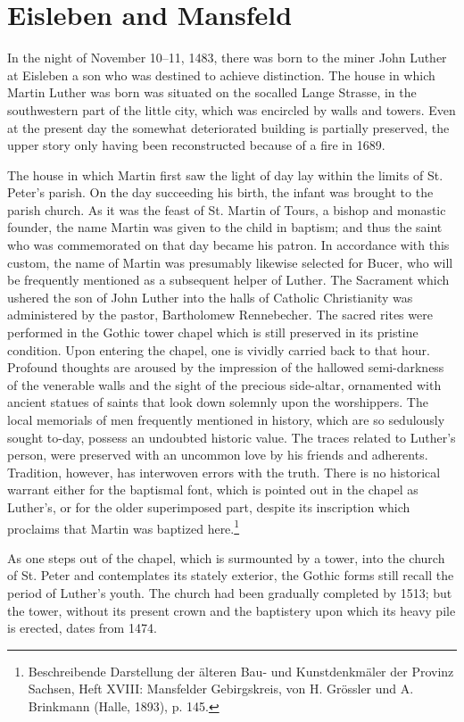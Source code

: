 \section{Eisleben and Mansfeld}

In the night of November 10--11, 1483, there was born to the miner
John Luther at Eisleben a son who was destined to achieve distinction.
The house in which Martin Luther was born was situated on the socalled Lange Strasse, in the southwestern part of the little city, which
was encircled by walls and towers. Even at the present day the somewhat deteriorated building is partially preserved, the upper story only
having been reconstructed because of a fire in 1689.

The house in which Martin first saw the light of day lay within the
limits of St. Peter’s parish. On the day succeeding his birth, the infant
was brought to the parish church. As it was the feast of St. Martin of
Tours, a bishop and monastic founder, the name Martin was given
to the child in baptism; and thus the saint who was commemorated on that day became his patron. In accordance with this custom,
the name of Martin was presumably likewise selected for Bucer, who
will be frequently mentioned as a subsequent helper of Luther. The
Sacrament which ushered the son of John Luther into the halls of Catholic Christianity was administered by the pastor, Bartholomew Rennebecher.
The sacred rites were performed in the Gothic tower chapel
which is still preserved in its pristine condition. Upon entering the
chapel, one is vividly carried back to that hour. Profound thoughts are
aroused by the impression of the hallowed semi-darkness of the venerable walls and the sight of the precious side-altar, ornamented with
ancient statues of saints that look down solemnly upon the worshippers.
The local memorials of men frequently mentioned in history, which are
so sedulously sought to-day, possess an undoubted historic value. The
traces related to Luther’s person, were preserved with an uncommon
love by his friends and adherents. Tradition, however, has interwoven
errors with the truth. There is no historical warrant either for the baptismal font, which is pointed out in the chapel as Luther’s, or for the older superimposed part, despite its inscription which proclaims that
Martin was baptized here.\footnote{Beschreibende Darstellung der älteren Bau- und Kunstdenkmäler der Provinz Sachsen, Heft XVIII: Mansfelder Gebirgskreis, von H. Grössler und A. Brinkmann (Halle, 1893), p. 145.}

As one steps out of the chapel, which is surmounted by a tower, into
the church of St. Peter and contemplates its stately exterior, the Gothic
forms still recall the period of Luther’s youth. The church had been
gradually completed by 1513; but the tower, without its present
crown and the baptistery upon which its heavy pile is erected, dates
from 1474.

